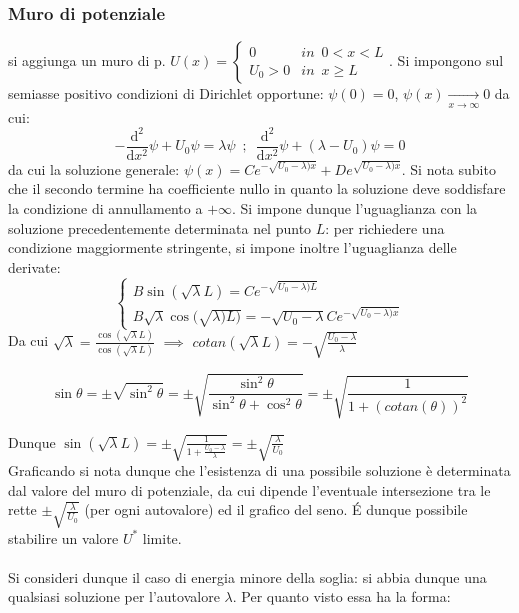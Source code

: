 \documentclass[10pt, oneside]{book}
\theoremstyle{plain}
\begin{document}
\subsubsection{Muro di potenziale} si aggiunga un muro di p. $\displaystyle U(x) = \begin{cases}
    0 & in \enspace 0<x<L\\ U_0 > 0 & in \enspace x \geq L
\end{cases}$. Si impongono sul semiasse positivo condizioni di Dirichlet opportune: $\psi(0) = 0$, $\psi(x) \xrightarrow[x \rightarrow \infty]{} 0$ da cui: 
\[- \frac{\textrm{d}^2}{\textrm{d}x^2}\psi + U_0 \psi= \lambda \psi \enspace ; \enspace \frac{\textrm{d}^2}{\textrm{d}x^2}\psi + (\lambda - U_0) \psi = 0\]
da cui la soluzione generale: $\displaystyle \psi(x) = C e^{\displaystyle - \sqrt{U_0 - \lambda) x}} + D  e^{\displaystyle \sqrt{U_0 - \lambda) x}}$. Si nota subito che il secondo termine ha coefficiente nullo in quanto la soluzione deve soddisfare la condizione di annullamento a $+\infty$. Si impone dunque l'uguaglianza con la soluzione precedentemente determinata nel punto $L$: per richiedere una condizione maggiormente stringente, si impone inoltre l'uguaglianza delle derivate:
\[\begin{cases}
    B \sin(\sqrt{\lambda}L) = C  e^{\displaystyle - \sqrt{U_0 - \lambda) L}}\\
    B \sqrt{\lambda} \cos(\sqrt{\lambda) L)} = - \sqrt{U_0 - \lambda} C e^{\displaystyle - \sqrt{U_0 - \lambda) x}}
\end{cases}\]
Da cui $\displaystyle \sqrt{\lambda} = \frac{\cos(\sqrt{\lambda} L)}{\cos(\sqrt{\lambda} L)}$ $\implies$ $\displaystyle cotan(\sqrt{\lambda} L) = - \sqrt{\frac{U_0 - \lambda}{\lambda}}$
\begin{oss}[trigonometrica]
    \[\sin \theta = \pm \sqrt{\sin^2 \theta} = \pm \sqrt{\frac{\sin^2 \theta}{\sin^2 \theta + \cos^2 \theta}} = \pm \sqrt{\frac{1}{1 + (cotan (\theta))^2}}\]
\end{oss}
Dunque $\displaystyle \sin(\sqrt{\lambda} L) = \pm \sqrt{\frac{1}{\displaystyle 1 + \frac{U_0 - \lambda}{\lambda}}} = \pm \sqrt{\frac{\lambda}{U_0}}$
\\Graficando si nota dunque che l'esistenza di una possibile soluzione è determinata dal valore del muro di potenziale, da cui dipende l'eventuale intersezione tra le rette $\displaystyle \pm \sqrt{\frac{\lambda}{U_0}}$ (per ogni autovalore) ed il grafico del seno. \'E dunque possibile stabilire un valore $U^{\ast}$ limite.
\\~\\Si consideri dunque il caso di energia minore della soglia: si abbia dunque una qualsiasi soluzione per l'autovalore $\lambda$. Per quanto visto essa ha la forma:
\end{document}
